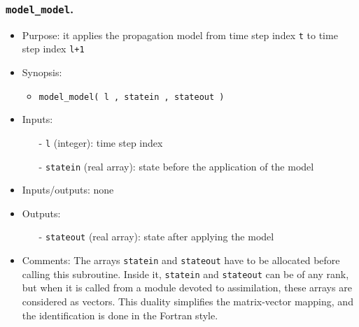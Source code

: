 \documentclass[12pt]{article}
\begin{document}
\subsubsection{{\tt model\_model}.}
\begin{itemize}
\item Purpose: it applies the propagation model from time step index {\tt t} to time step index {\tt l+1} 
\item Synopsis: 
\begin{itemize}
\item {\tt model\_model( l , statein , stateout )}
\end{itemize}
\item Inputs: 
\begin{itemize}
\item[-] {\tt l} (integer): time step index
\item[-] {\tt statein} (real array): state before the application of the model
\end{itemize}
\item Inputs/outputs: none
\item Outputs: 
\begin{itemize}
\item[-] {\tt stateout} (real array): state after applying the model
\end{itemize}
\item Comments: The arrays {\tt statein} and {\tt stateout} have to be allocated before calling this subroutine. Inside it, {\tt statein} and {\tt stateout} can be of any rank, but when it is called from a module devoted to assimilation, these arrays are considered as vectors. This duality simplifies the matrix-vector mapping, and the identification is done in the Fortran style. 
\end{itemize} 
\end{document}
